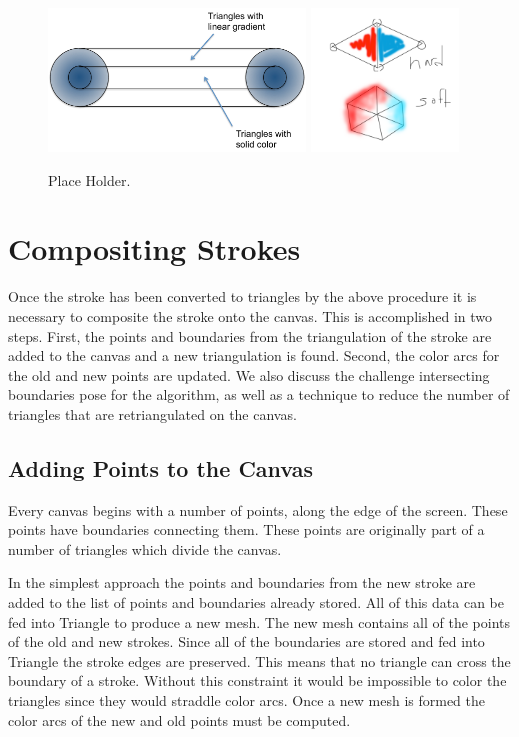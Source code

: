 \documentclass[review]{acmsiggraph}
\begin{document}
\begin{figure}
    \centering
        \includegraphics[height=1.5in]{images/softstroke}
        \includegraphics[height=1.5in]{images/hardvssoft}
    \caption{Place Holder.}
\end{figure}

\section{Compositing Strokes}
Once the stroke has been converted to triangles by the above procedure it is necessary to
composite the stroke onto the canvas. This is accomplished in two steps. First, the points
and boundaries from the triangulation of the stroke are added to the canvas and a new
triangulation is found. Second, the color arcs for the old and new points are updated.
We also discuss the challenge intersecting boundaries pose for the algorithm, as well
as a technique to reduce the number of triangles that are retriangulated on the canvas.


\subsection{Adding Points to the Canvas}

Every canvas begins with a number of points, along the edge of the screen. These
points have boundaries connecting them. These points are originally part of a number of triangles which
divide the canvas.

In the simplest approach the points and boundaries from the new stroke are added
to the list of points and boundaries already stored. All of this data can be fed into Triangle
to produce a new mesh. The new mesh contains all of the points of the old and new strokes. Since
all of the boundaries are stored and fed into Triangle the stroke edges are preserved. This means that
no triangle can cross the boundary of a stroke. Without this constraint it would be impossible to color the
triangles since they would straddle color arcs. Once a new mesh is formed the color arcs of the 
new and old points must be computed.
\end{document}
